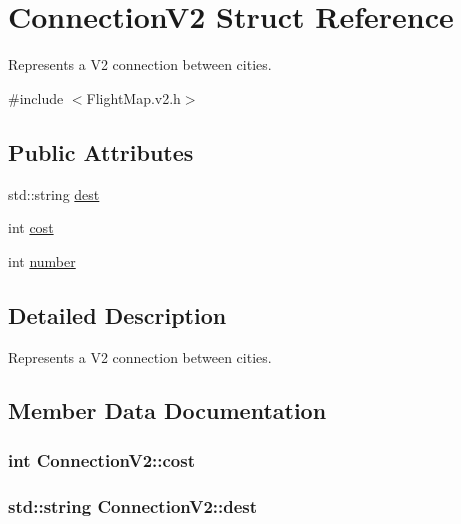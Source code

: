 \hypertarget{struct_connection_v2}{}\section{Connection\+V2 Struct Reference}
\label{struct_connection_v2}


Represents a V2 connection between cities.  




{\ttfamily \#include $<$Flight\+Map.\+v2.\+h$>$}

\subsection*{Public Attributes}
\begin{DoxyCompactItemize}
\item 
std\+::string \hyperlink{struct_connection_v2_afa32e7ec1e6acec2848a3cc0fd6d0a5b}{dest}
\item 
int \hyperlink{struct_connection_v2_af72c579e3e65c9e6beb22a352559c6c8}{cost}
\item 
int \hyperlink{struct_connection_v2_a9c84f78e218271fb9950af216b614a4e}{number}
\end{DoxyCompactItemize}


\subsection{Detailed Description}
Represents a V2 connection between cities. 

\subsection{Member Data Documentation}
\subsubsection[{\texorpdfstring{cost}{cost}}]{\setlength{\rightskip}{0pt plus 5cm}int Connection\+V2\+::cost}\hypertarget{struct_connection_v2_af72c579e3e65c9e6beb22a352559c6c8}{}\label{struct_connection_v2_af72c579e3e65c9e6beb22a352559c6c8}
\subsubsection[{\texorpdfstring{dest}{dest}}]{\setlength{\rightskip}{0pt plus 5cm}std\+::string Connection\+V2\+::dest}\hypertarget{struct_connection_v2_afa32e7ec1e6acec2848a3cc0fd6d0a5b}{}\label{struct_connection_v2_afa32e7ec1e6acec2848a3cc0fd6d0a5b}
